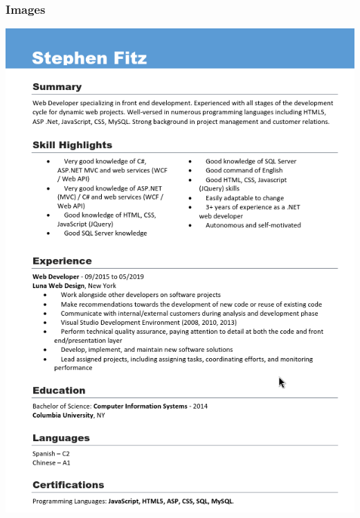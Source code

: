 \documentclass[a4paper]{article}
\begin{document}
    
          \subsubsection{Images}
      
              \begin{minipage}[c]{\textwidth}
          \centering
          \includegraphics[width=\textwidth]{src/issues/2 - POV/issue21.png}
          \label{2:POV:issue.md:issue21.png}
          \vspace{4ex}
        \end{minipage}
\end{document}
